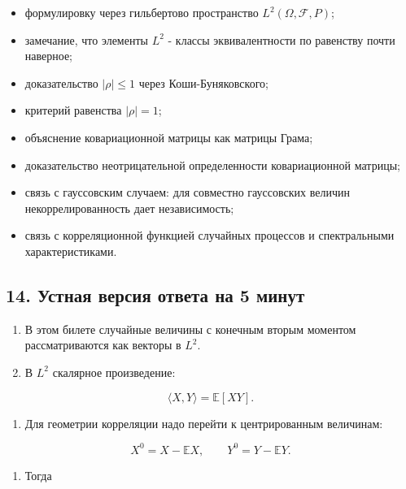 \documentclass[
  11pt,
  a4paper,
]{article}
\providecommand{\tightlist}{%
  \setlength{\itemsep}{0pt}\setlength{\parskip}{0pt}}
\begin{document}
\begin{itemize}
\tightlist
\item
  формулировку через гильбертово пространство
  \(L^2(\Omega,\mathcal F,P)\);
\item
  замечание, что элементы \(L^2\) - классы эквивалентности по равенству
  почти наверное;
\item
  доказательство \(|\rho|\le1\) через Коши-Буняковского;
\item
  критерий равенства \(|\rho|=1\);
\item
  объяснение ковариационной матрицы как матрицы Грама;
\item
  доказательство неотрицательной определенности ковариационной матрицы;
\item
  связь с гауссовским случаем: для совместно гауссовских величин
  некоррелированность дает независимость;
\item
  связь с корреляционной функцией случайных процессов и спектральными
  характеристиками.
\end{itemize}

\subsection{14. Устная версия ответа на 5
минут}\label{ux443ux441ux442ux43dux430ux44f-ux432ux435ux440ux441ux438ux44f-ux43eux442ux432ux435ux442ux430-ux43dux430-5-ux43cux438ux43dux443ux442}

\begin{enumerate}
\def\labelenumi{\arabic{enumi}.}
\tightlist
\item
  В этом билете случайные величины с конечным вторым моментом
  рассматриваются как векторы в \(L^2\).
\item
  В \(L^2\) скалярное произведение:
\end{enumerate}

\[
\langle X,Y\rangle=\mathbb E[XY].
\]

\begin{enumerate}
\def\labelenumi{\arabic{enumi}.}
\setcounter{enumi}{2}
\tightlist
\item
  Для геометрии корреляции надо перейти к центрированным величинам:
\end{enumerate}

\[
X^0=X-\mathbb EX,
\qquad
Y^0=Y-\mathbb EY.
\]

\begin{enumerate}
\def\labelenumi{\arabic{enumi}.}
\setcounter{enumi}{3}
\tightlist
\item
  Тогда
\end{enumerate}
\end{document}
